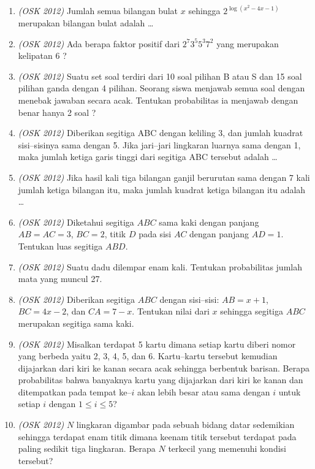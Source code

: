 \documentclass[11pt]{scrartcl}
\begin{document}
\begin{enumerate}
\item \textit{(OSK 2012)} Jumlah semua bilangan bulat $x$ sehingga $2^{\log(x^2 - 4x - 1)}$ merupakan bilangan bulat adalah \dots

\item \textit{(OSK 2012)} Ada berapa faktor positif dari $2^7 3^5 5^3 7^2$ yang merupakan kelipatan 6 ?

\item \textit{(OSK 2012)} Suatu set soal terdiri dari 10 soal pilihan B atau S dan 15 soal pilihan ganda dengan 4 pilihan. Seorang siswa menjawab semua soal dengan menebak jawaban secara acak. Tentukan probabilitas ia menjawab dengan benar hanya 2 soal ?

\item \textit{(OSK 2012)} Diberikan segitiga ABC dengan keliling 3, dan jumlah kuadrat sisi–sisinya sama dengan 5. Jika jari–jari lingkaran luarnya sama dengan 1, maka jumlah ketiga garis tinggi dari segitiga ABC tersebut adalah \dots

\item \textit{(OSK 2012)} Jika hasil kali tiga bilangan ganjil berurutan sama dengan 7 kali jumlah ketiga bilangan itu, maka jumlah kuadrat ketiga bilangan itu adalah \dots

\item \textit{(OSK 2012)} Diketahui segitiga $ABC$ sama kaki dengan panjang $AB = AC = 3$, $BC = 2$, titik $D$ pada sisi $AC$ dengan panjang $AD = 1$. Tentukan luas segitiga $ABD$.

\item \textit{(OSK 2012)} Suatu dadu dilempar enam kali. Tentukan probabilitas jumlah mata yang muncul 27.

\item \textit{(OSK 2012)} Diberikan segitiga $ABC$ dengan sisi–sisi: $AB = x + 1$, $BC = 4x - 2$, dan $CA = 7 - x$. Tentukan nilai dari $x$ sehingga segitiga $ABC$ merupakan segitiga sama kaki.

\item \textit{(OSK 2012)} Misalkan terdapat 5 kartu dimana setiap kartu diberi nomor yang berbeda yaitu 2, 3, 4, 5, dan 6. Kartu–kartu tersebut kemudian dijajarkan dari kiri ke kanan secara acak sehingga berbentuk barisan. Berapa probabilitas bahwa banyaknya kartu yang dijajarkan dari kiri ke kanan dan ditempatkan pada tempat ke–$i$ akan lebih besar atau sama dengan $i$ untuk setiap $i$ dengan $1 \le i \le 5$?

\item \textit{(OSK 2012)} $N$ lingkaran digambar pada sebuah bidang datar sedemikian sehingga terdapat enam titik dimana keenam titik tersebut terdapat pada paling sedikit tiga lingkaran. Berapa $N$ terkecil yang memenuhi kondisi tersebut?

\end{enumerate}
\newpage
\end{document}
